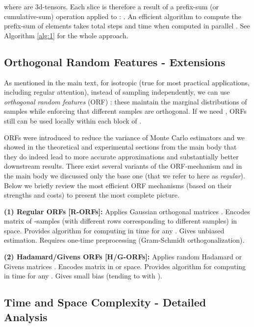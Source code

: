 where  are 3d-tensors. Each slice  is therefore a result of a prefix-sum (or cumulative-sum) operation applied to : . An efficient algorithm to compute the prefix-sum of  elements takes  total steps and  time when computed in parallel \citep{cumsum, cormen}. 
See Algorithm \ref{alg:1} for the whole approach.


\subsection{Orthogonal Random Features - Extensions}
\label{subsec:extensions}

As mentioned in the main text, for isotropic  (true for most practical applications, including regular attention), instead of sampling  independently, we can use \emph{orthogonal random features} (ORF) \citep{ort, unreas, geom}: these maintain the marginal distributions of samples  while enforcing that different samples are orthogonal. If we need , ORFs still can be used locally within each  block of  \citep{ort}.

ORFs were introduced to reduce the variance of Monte Carlo estimators \citep{ort, unreas, geom, kama, hron,psrnn, uni} and we showed in the theoretical and experimental sections from the main body that they do indeed lead to more accurate approximations and substantially better downstream results. There exist several variants of the ORF-mechanism and in the main body we discussed only the base one (that we refer to here as \textit{regular}). Below we briefly review the most efficient ORF mechanisms (based on their strengths and costs) to present the most complete picture.

\textbf{(1) Regular ORFs [R-ORFs]:} Applies Gaussian orthogonal matrices \citep{ort}. Encodes matrix  of -samples (with different rows corresponding to different samples) in  space. Provides algorithm for computing  in  time for any . Gives unbiased estimation. Requires one-time  preprocessing (Gram-Schmidt orthogonalization).

\textbf{(2) Hadamard/Givens ORFs [H/G-ORFs]:} Applies random Hadamard \citep{unreas} or Givens matrices \citep{uni}. Encodes matrix  in  or  space. Provides algorithm for computing  in  time for any . Gives small bias (tending to  with ).

\subsection{Time and Space Complexity - Detailed Analysis}

